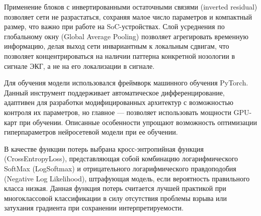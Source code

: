 \documentclass[10pt,a4paper]{book}
\begin{document}
Применение блоков с инвертированными остаточными связями (inverted residual) позволяет сети не разрастаться, сохраняя малое число параметров и компактный размер, что важно при работе на SoC-устройствах. Слой усреднения по глобальному окну (Global Average Pooling) позволяет агрегировать временную информацию, делая выход сети инвариантным к локальным сдвигам, что позволяет концентрироваться на наличии паттерна конкретной нозологии в сигнале ЭКГ, а не на его локализации в сигнале.

Для обучения модели использовался фреймворк машинного обучения PyTorch. Данный инструмент поддерживает автоматическое дифференцирование, адаптивен для разработки модифицированных архитектур с возможностью контроля их параметров, но главное --- позволяет использовать мощности GPU-карт при обучении. Описанные особенности упрощают возможность оптимизации гиперпараметров нейросетевой модели при ее обучении.



В качестве функции потерь выбрана кросс-энтропийная функция (CrossEntropyLoss), представляющая собой комбинацию логарифмического SoftMax (LogSoftmax) и отрицательного логарифмического правдоподобия (Negative Log Likelihood), штрафующая модель, если вероятность правильного класса низкая. Данная функция потерь считается лучшей практикой при многоклассовой классификации в силу отсутствия проблемы взрыва или затухания градиента при сохранении интерпретируемости.
\end{document}
